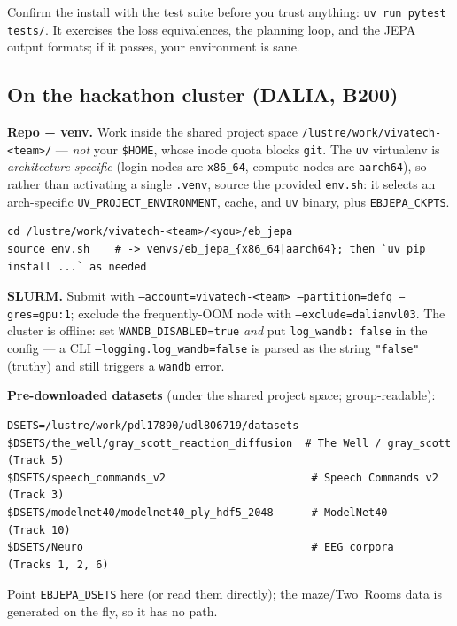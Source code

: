 \documentclass{article}
\newcommand{\code}[1]{\texttt{\small #1}}
\newcommand{\file}[1]{\texttt{\small #1}}
\begin{document}
\begin{tipbox}
Confirm the install with the test suite before you trust anything:
\code{uv run pytest tests/}. It exercises the loss equivalences, the planning
loop, and the JEPA output formats; if it passes, your environment is sane.
\end{tipbox}

\subsection{On the hackathon cluster (DALIA, B200)}
\label{sec:cluster}

\textbf{Repo + venv.} Work inside the shared project space \code{/lustre/work/vivatech-<team>/}
--- \emph{not} your \code{\$HOME}, whose inode quota blocks \code{git}. The \code{uv}
virtualenv is \emph{architecture-specific} (login nodes are \code{x86\_64}, compute
nodes are \code{aarch64}), so rather than activating a single \code{.venv}, source the
provided \file{env.sh}: it selects an arch-specific \code{UV\_PROJECT\_ENVIRONMENT},
cache, and \code{uv} binary, plus \code{EBJEPA\_CKPTS}.
\begin{lstlisting}[style=bash]
cd /lustre/work/vivatech-<team>/<you>/eb_jepa
source env.sh    # -> venvs/eb_jepa_{x86_64|aarch64}; then `uv pip install ...` as needed
\end{lstlisting}

\textbf{SLURM.} Submit with \code{--account=vivatech-<team> --partition=defq --gres=gpu:1};
exclude the frequently-OOM node with \code{--exclude=dalianvl03}. The cluster is
offline: set \code{WANDB\_DISABLED=true} \emph{and} put \code{log\_wandb: false} in
the config --- a CLI \code{--logging.log\_wandb=false} is parsed as the string
\code{"false"} (truthy) and still triggers a \code{wandb} error.

\textbf{Pre-downloaded datasets} (under the shared project space; group-readable):
\begin{lstlisting}[style=bash]
DSETS=/lustre/work/pdl17890/udl806719/datasets
$DSETS/the_well/gray_scott_reaction_diffusion  # The Well / gray_scott (Track 5)
$DSETS/speech_commands_v2                       # Speech Commands v2  (Track 3)
$DSETS/modelnet40/modelnet40_ply_hdf5_2048      # ModelNet40          (Track 10)
$DSETS/Neuro                                    # EEG corpora        (Tracks 1, 2, 6)
\end{lstlisting}
Point \code{EBJEPA\_DSETS} here (or read them directly); the maze/Two~Rooms data is
generated on the fly, so it has no path.
\end{document}
